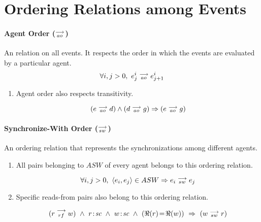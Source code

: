         \section{Ordering Relations among Events}
        
        \paragraph{Agent Order ($\stackrel{\longrightarrow}{_{ao}}$)}
            An relation on all events. It respects the order in which the events are evaluated by a particular agent. 
            \[\forall{i, j > 0},\ e^i_j \stackrel{\longrightarrow}{_{ao}} e^i_{j+1} \]
        
            \begin{enumerate}
                \item Agent order also respects transitivity. 
            
                    \[ (e \stackrel{\longrightarrow}{_{ao}} d) \wedge (d \stackrel{\longrightarrow}{_{ao}} g) \Rightarrow{} (e \stackrel{\longrightarrow}{_{ao}} g)\]
            
            \end{enumerate}
            
        
        \paragraph{Synchronize-With Order ($\stackrel{\longrightarrow}{_{sw}} $)}
            An ordering relation that represents the synchronizations among different agents.
            \begin{enumerate}
                \item All pairs belonging to $ASW$ of every agent belongs to this ordering relation. 
            
                        \[\forall{i, j > 0}, \ \langle e_i, e_j \rangle \in ASW \Rightarrow{} e_i \stackrel{\longrightarrow}{_{sw}} e_j \]
            
                \item Specific reads-from pairs also belong to this ordering relation. 
            
                        \[(r \stck{_{rf}} w) \ \wedge \ \et{r}{sc} \ \wedge \ \et{w}{sc} \ \wedge \ (\Re(r)\!=\!\Re(w)) \ \Rightarrow{} \ (w \stck{_{sw}} r)\]
            
            \end{enumerate}
            
